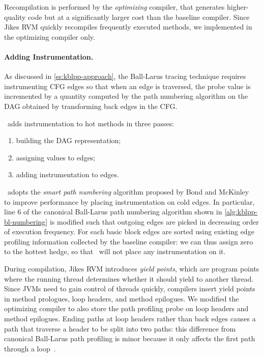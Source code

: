 Recompilation is performed by the {\em optimizing} compiler, that generates higher-quality code but at a significantly larger cost than the baseline compiler. Since Jikes RVM quickly recompiles frequently executed methods, we implemented \kblpp in the optimizing compiler only.

\paragraph*{Adding Instrumentation.} As discussed in \mysection\ref{ss:kblpp-approach}, the Ball-Larus tracing technique requires instrumenting CFG edges so that when an edge is traversed, the probe value is incremented by a quantity computed by the path numbering algorithm on the DAG obtained by transforming back edges in the CFG.

\kblpp\ adds instrumentation to hot methods in three passes:
\begin{enumerate}[itemsep=0pt]
 \item building the DAG representation;
 \item assigning values to edges;
 \item adding instrumentation to edges.
\end{enumerate}

\noindent \kblpp\ adopts the {\em smart path numbering} algorithm proposed by Bond and McKinley~\cite{Bond05b} to improve performance by placing instrumentation on cold edges. In particular, line 6 of the canonical Ball-Larus path numbering algorithm shown in \myalgorithm\ref{alg:kblpp-bl-numbering}  is modified such that outgoing edges are picked in decreasing order of execution frequency. For each basic block edges are sorted using existing edge profiling information collected by the baseline compiler: we can thus assign zero to the hottest hedge, so that \kblpp\ will not place any instrumentation on it.

During compilation, Jikes RVM introduces {\em yield points}, which are program points where the running thread determines whether it should yield to another thread. Since JVMs need to gain control of threads quickly, compilers insert yield points in method prologues, loop headers, and method epilogues. We modified the optimizing compiler to also store the path profiling probe on loop headers and method epilogues. Ending paths at loop headers rather than back edges causes a path that traverse a header to be split into two paths: this difference from canonical Ball-Larus path profiling is minor because it only affects the first path through a loop~\cite{Bond05}.

